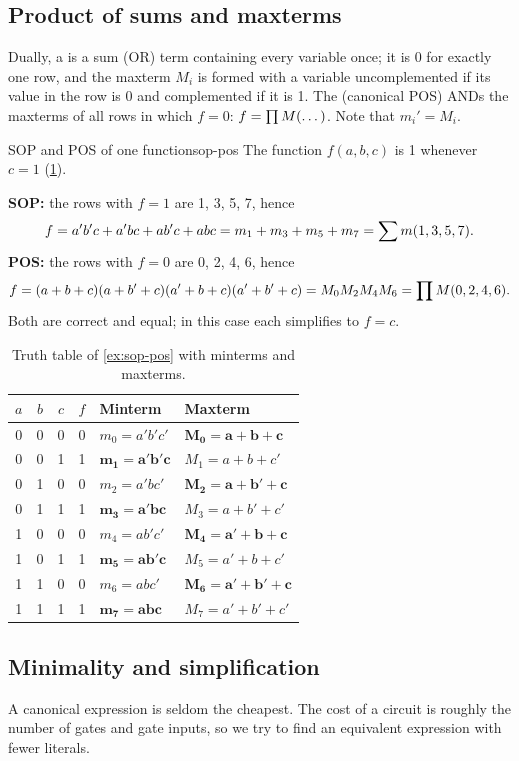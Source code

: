 \subsection{Product of sums and maxterms}
Dually, a  is a sum (OR) term containing every variable once; it is 0 for exactly one row, and the maxterm $M_i$ is formed with a variable uncomplemented if its value in the row is 0 and complemented if it is 1. The  (canonical POS) ANDs the maxterms of all rows in which $f=0$: $f=\prod M(\dots)$. Note that $m_i' = M_i$.

\begin{example}{SOP and POS of one function}{sop-pos}
The function $f(a,b,c)$ is 1 whenever $c=1$ (\cref{tab:sop-pos}).

\textbf{SOP:} the rows with $f=1$ are 1, 3, 5, 7, hence
\[
 f = a'b'c + a'bc + ab'c + abc = m_1+m_3+m_5+m_7 = \sum m(1,3,5,7).
\]
\textbf{POS:} the rows with $f=0$ are 0, 2, 4, 6, hence
\[
 f = (a+b+c)(a+b'+c)(a'+b+c)(a'+b'+c) = M_0M_2M_4M_6 = \prod M(0,2,4,6).
\]
Both are correct and equal; in this case each simplifies to $f=c$.
\end{example}

\begin{table}[htbp]
\centering
\caption{Truth table of \cref{ex:sop-pos} with minterms and maxterms.}
\label{tab:sop-pos}
\begin{tabular}{ccc|c|ll}
\toprule
$a$&$b$&$c$&$f$&Minterm&Maxterm\\ \midrule
0&0&0&0&$m_0 = a'b'c'$&$\mathbf{M_0 = a+b+c}$\\
0&0&1&1&$\mathbf{m_1 = a'b'c}$&$M_1 = a+b+c'$\\
0&1&0&0&$m_2 = a'bc'$&$\mathbf{M_2 = a+b'+c}$\\
0&1&1&1&$\mathbf{m_3 = a'bc}$&$M_3 = a+b'+c'$\\
1&0&0&0&$m_4 = ab'c'$&$\mathbf{M_4 = a'+b+c}$\\
1&0&1&1&$\mathbf{m_5 = ab'c}$&$M_5 = a'+b+c'$\\
1&1&0&0&$m_6 = abc'$&$\mathbf{M_6 = a'+b'+c}$\\
1&1&1&1&$\mathbf{m_7 = abc}$&$M_7 = a'+b'+c'$\\
\bottomrule
\end{tabular}
\end{table}

\subsection{Minimality and simplification}
A canonical expression is seldom the cheapest. The cost of a circuit is roughly the number of gates and gate inputs, so we try to find an equivalent expression with fewer literals.

